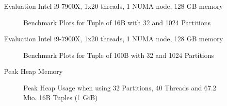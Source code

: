 \begin{frame}{Evaluation}
  Intel i9-7900X, 1x20 threads, 1 NUMA node, 128 GB memory
  \begin{figure}[h]
    \centering
    \begin{subfigure}{.49\textwidth}
      \centering
      \resizebox{\linewidth}{!}{}
    \end{subfigure}
    \begin{subfigure}{.49\textwidth}
      \centering
      \resizebox{\linewidth}{!}{}
    \end{subfigure}
    \begin{subfigure}{\textwidth}
      \centering
      \resizebox{.85\linewidth}{!}{}
    \end{subfigure}
    \caption[Shuffle Benchmark Plots for Tuple of 16B with 32 and 1024 Partitions]{Benchmark Plots for Tuple of 16B with 32 and 1024 Partitions}
    \label{plot-shuffle-16B-32-1024}
  \end{figure}
\end{frame}

\begin{frame}{Evaluation}
  Intel i9-7900X, 1x20 threads, 1 NUMA node, 128 GB memory
  \begin{figure}[h]
    \centering
    \begin{subfigure}{.49\textwidth}
      \centering
      \resizebox{\linewidth}{!}{}
    \end{subfigure}
    \begin{subfigure}{.49\textwidth}
      \centering
      \resizebox{\linewidth}{!}{}
    \end{subfigure}
    \begin{subfigure}{\textwidth}
      \centering
      \resizebox{.85\linewidth}{!}{}
    \end{subfigure}
    \caption[Shuffle Benchmark Plots for Tuple of 100B with 32 and 1024 Partitions]{Benchmark Plots for Tuple of 100B with 32 and 1024 Partitions}
    \label{plot-shuffle-100B-32-1024}
  \end{figure}
\end{frame}
\begin{frame}{Peak Heap Memory}
  \begin{figure}[h]
    \centering
    \resizebox{.85\linewidth}{!}{}
    \caption[Peak Heap Memory Benchmark Plot]{Peak Heap Usage when using 32 Partitions, 40 Threads and 67.2 Mio.
      16B Tuples (1 GiB)} \label{plot-heap-16B-P32-Th40}
  \end{figure}
\end{frame}

